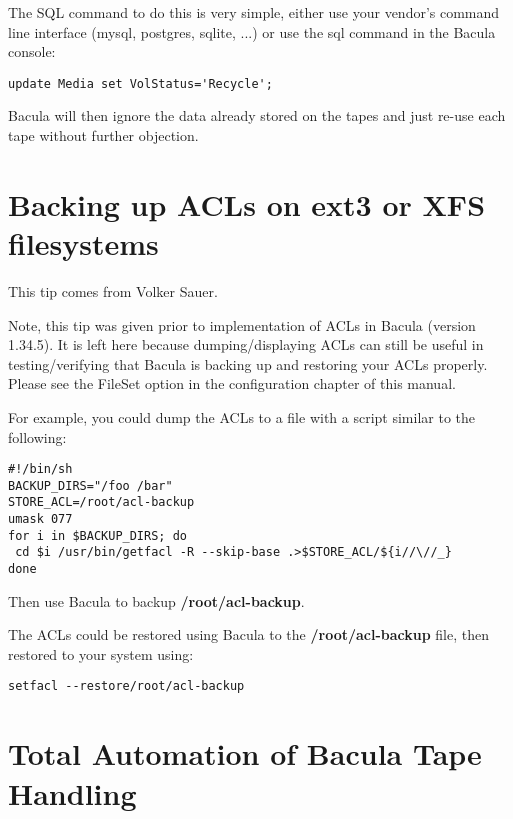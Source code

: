 The SQL command to do this is very simple, either use your vendor's
command line interface (mysql, postgres, sqlite, ...) or use the sql
command in the Bacula console:

\footnotesize
\begin{verbatim}
update Media set VolStatus='Recycle';
\end{verbatim}
\normalsize

Bacula will then ignore the data already stored on the tapes and just re-use
each tape without further objection.

\section{Backing up ACLs on ext3 or XFS filesystems}
\label{ACLs}

This tip comes from Volker Sauer.

Note, this tip was given prior to implementation of ACLs in Bacula (version
1.34.5). It is left here because dumping/displaying ACLs can still be useful
in testing/verifying that Bacula is backing up and restoring your ACLs
properly. Please see the
 FileSet option in the
configuration chapter of this manual.

For example, you could dump the ACLs to a file with a script similar to the
following:

\footnotesize
\begin{verbatim}
#!/bin/sh
BACKUP_DIRS="/foo /bar"
STORE_ACL=/root/acl-backup
umask 077
for i in $BACKUP_DIRS; do
 cd $i /usr/bin/getfacl -R --skip-base .>$STORE_ACL/${i//\//_}
done
\end{verbatim}
\normalsize

Then use Bacula to backup {\bf /root/acl-backup}.

The ACLs could be restored using Bacula to the {\bf /root/acl-backup} file,
then restored to your system using:

\footnotesize
\begin{verbatim}
setfacl --restore/root/acl-backup
\end{verbatim}
\normalsize

\section{Total Automation of Bacula Tape Handling}
\label{automate}


